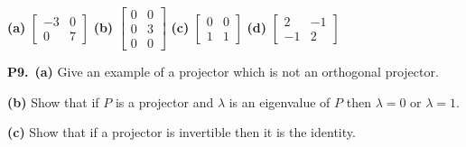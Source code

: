 \documentclass[12pt]{amsart}
\newcommand{\prob}[1]{\bigskip\noindent\textbf{#1.}\quad }
\newcommand{\epart}[1]{\medskip\noindent\textbf{(#1)}\quad }
\newcommand{\ppart}[1]{\,\textbf{(#1)}\quad }
\newcommand{\ds}{\displaystyle}
\begin{document}
\textbf{(a)} \quad $\ds \begin{bmatrix} -3 & 0 \\ 0 & 7 \end{bmatrix}$ \qquad
\textbf{(b)} \quad $\ds \begin{bmatrix} 0 & 0 \\ 0 & 3 \\ 0 & 0 \end{bmatrix}$ \qquad
\textbf{(c)} \quad $\ds \begin{bmatrix} 0 & 0 \\ 1 & 1 \end{bmatrix}$ \qquad
\textbf{(d)} \quad $\ds \begin{bmatrix} 2 & -1 \\ -1 & 2 \end{bmatrix}$

\prob{P9}  \ppart{a} Give an example of a projector which is not an orthogonal projector.

\epart{b} Show that if $P$ is a projector and $\lambda$ is an eigenvalue of $P$ then $\lambda = 0$ or $\lambda = 1$.

\epart{c} Show that if a projector is invertible then it is the identity.
\end{document}
